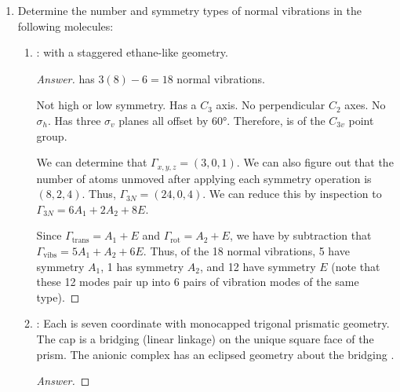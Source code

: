 \documentclass[../psets.tex]{subfiles}
\begin{document}
\begin{enumerate}[label={\Roman*)}]
\begin{proof}[Answer]
        The structure in Figure \ref{fig:structure-CoCO4SiMe3b}: Not high or low symmetry. Has a $C_3$ axis. No perpendicular $C_2$ axes. No $\sigma_h$. Has three $\sigma_v$ planes all offset by $\ang{60}$. Therefore, it is of the $C_{3v}$ point group.\par
        We can determine that $\Gamma_\nu=(4,1,2)=2A_1+E$ by counting how many $\overrightarrow{\ce{Co-CO}}$ vectors stay the same under each symmetry operation and decomposing by inspection. With four $\nu(\ce{CO})$ stretching modes that are all IR active (but two of the four being degenerate), we can expect there to be three peaks in the infrared spectrum of . This confirms that this is the correct structure.
    \end{proof}
    \newpage
    \item Determine the number and symmetry types of normal vibrations in the following molecules:
    \begin{enumerate}[label={\alph*)}]
        \item {}: with a staggered ethane-like geometry.
        \begin{proof}[Answer]
             has $3(8)-6=18$ normal vibrations.\par
            Not high or low symmetry. Has a $C_3$ axis. No perpendicular $C_2$ axes. No $\sigma_h$. Has three $\sigma_v$ planes all offset by $\ang{60}$. Therefore,  is of the $C_{3v}$ point group.\par
            We can determine that $\Gamma_{x,y,z}=(3,0,1)$. We can also figure out that the number of atoms unmoved after applying each symmetry operation is $(8,2,4)$. Thus, $\Gamma_{3N}=(24,0,4)$. We can reduce this by inspection to $\Gamma_{3N}=6A_1+2A_2+8E$.\par
            Since $\Gamma_\text{trans}=A_1+E$ and $\Gamma_\text{rot}=A_2+E$, we have by subtraction that $\Gamma_\text{vibs}=5A_1+A_2+6E$. Thus, of the 18 normal vibrations, 5 have symmetry $A_1$, 1 has symmetry $A_2$, and 12 have symmetry $E$ (note that these 12 modes pair up into 6 pairs of vibration modes of the same type).
        \end{proof}
        \item {}: Each  is seven coordinate with monocapped trigonal prismatic geometry. The cap is a bridging  (linear  linkage) on the unique square face of the prism. The anionic complex has an eclipsed geometry about the bridging .
        \begin{proof}[Answer]

\end{proof}
\end{enumerate}
\end{enumerate}
\end{document}
